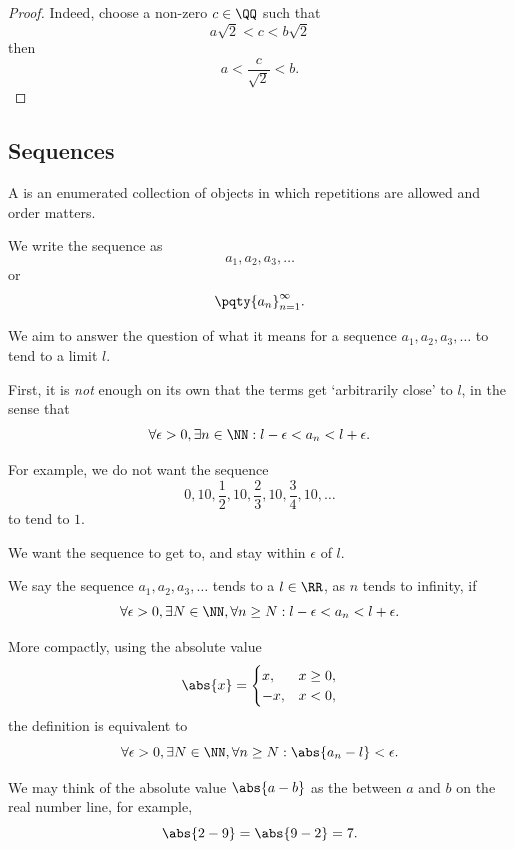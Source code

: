 \begin{proof}
    Indeed, choose a non-zero \(c \in \QQ\) such that
    \[
        a \sqrt{2} < c < b \sqrt{2}
    \]
    then
    \[
        a < \frac{c}{\sqrt{2}} < b.
    \]
\end{proof}

\subsection{Sequences}
\label{sec:sequences}

\begin{definition}[Sequence]
    A  is an enumerated collection of objects in which repetitions are allowed and order matters.

    We write the sequence as
    \[
        a_1, a_2, a_3, \ldots
    \]
    or
    \[
        \pqty{a_n}_{n = 1}^{\infty}.
    \]
\end{definition}

We aim to answer the question of what it means for a sequence \(a_1, a_2, a_3, \ldots\) to tend to a limit \(l\).

First, it is \emph{not} enough on its own that the terms get `arbitrarily close' to \(l\), in the sense that
\[
    \forall \epsilon > 0, \exists n \in \NN: l - \epsilon < a_n < l + \epsilon.
\]

For example, we do not want the sequence
\[
    0, 10, \frac{1}{2}, 10, \frac{2}{3}, 10, \frac{3}{4}, 10, \ldots
\]
to tend to \(1\).

We want the sequence to get to, and stay within \(\epsilon\) of \(l\).

\begin{definition}
    We say the sequence \(a_1, a_2, a_3, \ldots\) tends to a  \(l \in \RR\), as \(n\) tends to infinity, if
    \[
        \forall \epsilon > 0, \exists N \in \NN, \forall n \geq N: l - \epsilon < a_n < l + \epsilon.
    \]

    More compactly, using the absolute value
    \[
        \abs{x} = \begin{cases}
            x, & x \geq 0, \\
            -x, & x < 0,
        \end{cases}
    \]
    the definition is equivalent to
    \[
        \forall \epsilon > 0, \exists N \in \NN, \forall n \geq N: \abs{a_n - l} < \epsilon.
    \]
\end{definition}

We may think of the absolute value \(\abs{a - b}\) as the  between \(a\) and \(b\) on the real number line, for example,
\[
    \abs{2 - 9} = \abs{9 - 2} = 7.
\]

